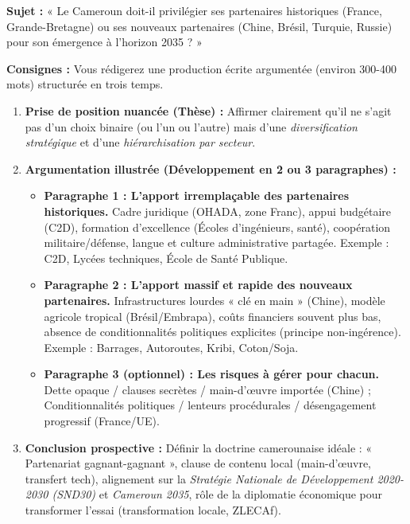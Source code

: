 \documentclass[11pt]{article}
\begin{document}
\begin{exercice}
\textbf{Sujet :} « Le Cameroun doit-il privilégier ses partenaires historiques (France, Grande-Bretagne) ou ses nouveaux partenaires (Chine, Brésil, Turquie, Russie) pour son émergence à l'horizon 2035 ? »

\textbf{Consignes :} Vous rédigerez une production écrite argumentée (environ 300-400 mots) structurée en trois temps.
\begin{enumerate}
\item \textbf{Prise de position nuancée (Thèse) :} Affirmer clairement qu'il ne s'agit pas d'un choix binaire (ou l'un ou l'autre) mais d'une \emph{diversification stratégique} et d'une \emph{hiérarchisation par secteur}.
\item \textbf{Argumentation illustrée (Développement en 2 ou 3 paragraphes) :}
\begin{itemize}
\item \textbf{Paragraphe 1 : L'apport irremplaçable des partenaires historiques.} Cadre juridique (OHADA, zone Franc), appui budgétaire (C2D), formation d'excellence (Écoles d'ingénieurs, santé), coopération militaire/défense, langue et culture administrative partagée. Exemple : C2D, Lycées techniques, École de Santé Publique.
\item \textbf{Paragraphe 2 : L'apport massif et rapide des nouveaux partenaires.} Infrastructures lourdes « clé en main » (Chine), modèle agricole tropical (Brésil/Embrapa), coûts financiers souvent plus bas, absence de conditionnalités politiques explicites (principe non-ingérence). Exemple : Barrages, Autoroutes, Kribi, Coton/Soja.
\item \textbf{Paragraphe 3 (optionnel) : Les risques à gérer pour chacun.} Dette opaque / clauses secrètes / main-d'œuvre importée (Chine) ; Conditionnalités politiques / lenteurs procédurales / désengagement progressif (France/UE).
\end{itemize}
\item \textbf{Conclusion prospective :} Définir la doctrine camerounaise idéale : « Partenariat gagnant-gagnant », clause de contenu local (main-d'œuvre, transfert tech), alignement sur la \emph{Stratégie Nationale de Développement 2020-2030 (SND30)} et \emph{Cameroun 2035}, rôle de la diplomatie économique pour transformer l'essai (transformation locale, ZLECAf).
\end{enumerate}
\end{exercice}

\newpage
\end{document}
